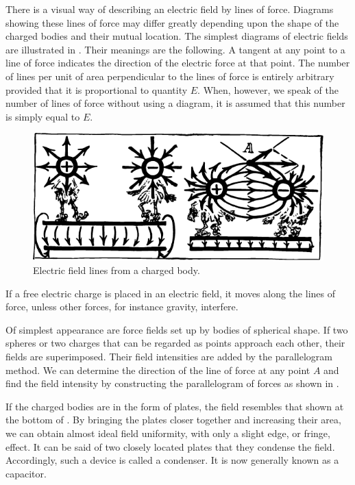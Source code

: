 There is a visual way of describing an electric field by lines of force. Diagrams showing these lines of force may differ greatly depending upon the shape of the charged bodies and their mutual location. The simplest diagrams of electric fields are illustrated in . Their meanings are the following. A tangent at any point to a line of force indicates the direction of the electric force at that point. The number of lines per unit of area perpendicular to the lines of force is entirely arbitrary provided that it is proportional to quantity $E$. When, however, we speak of the number of lines of force without using a diagram, it is assumed that this number is simply equal to $E$.
\begin{figure}[!ht]
\centering
\includegraphics[width=\textwidth]{figures/fig-01-01.pdf}
\caption{Electric field lines from a charged body.}
\label{fig-1.1}
\end{figure}

If a free electric charge is placed in an electric field, it moves along the lines of force, unless other forces, for instance gravity, interfere.

Of simplest appearance are force fields set up by bodies of spherical shape. If two spheres or two charges that can be regarded as points approach each other, their fields are superimposed. Their field intensities are added by the parallelogram method. We can determine the direction of the line of force at any point $A$ and find the field intensity by constructing the parallelogram of forces as shown in .

If the charged bodies are in the form of plates, the field resembles that shown at the bottom of . By bringing the plates closer together and increasing their area, we can obtain almost ideal field uniformity, with only a slight edge, or fringe, effect. It can be said of two closely located plates that they condense the field. Accordingly, such a device is called a condenser. It is now generally known as a capacitor.

